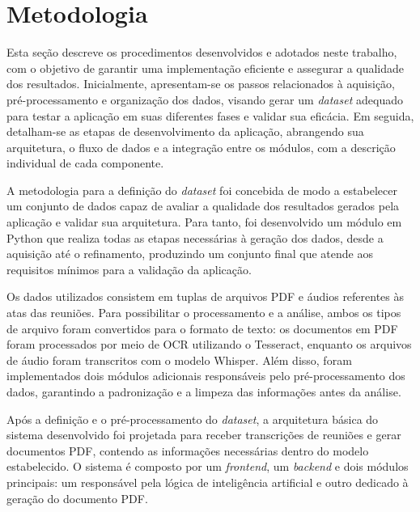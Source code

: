 \chapter{Metodologia}
\label{chap:metodologia}

Esta seção descreve os procedimentos desenvolvidos e adotados neste trabalho, com o objetivo de garantir uma implementação eficiente e assegurar a qualidade dos resultados. Inicialmente, apresentam-se os passos relacionados à aquisição, pré-processamento e organização dos dados, visando gerar um \textit{dataset} adequado para testar a aplicação em suas diferentes fases e validar sua eficácia. Em seguida, detalham-se as etapas de desenvolvimento da aplicação, abrangendo sua arquitetura, o fluxo de dados e a integração entre os módulos, com a descrição individual de cada componente.

A metodologia para a definição do \textit{dataset} foi concebida de modo a estabelecer um conjunto de dados capaz de avaliar a qualidade dos resultados gerados pela aplicação e validar sua arquitetura. Para tanto, foi desenvolvido um módulo em Python que realiza todas as etapas necessárias à geração dos dados, desde a aquisição até o refinamento, produzindo um conjunto final que atende aos requisitos mínimos para a validação da aplicação.

Os dados utilizados consistem em tuplas de arquivos PDF e áudios referentes às atas das reuniões. Para possibilitar o processamento e a análise, ambos os tipos de arquivo foram convertidos para o formato de texto: os documentos em PDF foram processados por meio de OCR utilizando o Tesseract, enquanto os arquivos de áudio foram transcritos com o modelo Whisper. Além disso, foram implementados dois módulos adicionais responsáveis pelo pré-processamento dos dados, garantindo a padronização e a limpeza das informações antes da análise.

Após a definição e o pré-processamento do \textit{dataset}, a arquitetura básica do sistema desenvolvido foi projetada para receber transcrições de reuniões e gerar documentos PDF, contendo as informações necessárias dentro do modelo estabelecido. O sistema é composto por um \textit{frontend}, um \textit{backend} e dois módulos principais: um responsável pela lógica de inteligência artificial e outro dedicado à geração do documento PDF.

